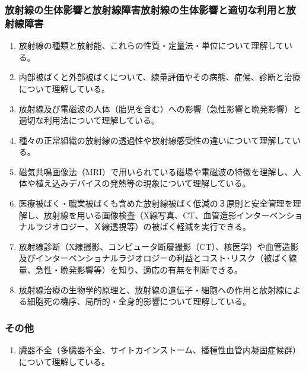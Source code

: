 \hypertarget{ux653eux5c04ux7ddaux306eux751fux4f53ux5f71ux97ffux3068ux653eux5c04ux7ddaux969cux5bb3ux653eux5c04ux7ddaux306eux751fux4f53ux5f71ux97ffux3068ux9069ux5207ux306aux5229ux7528ux3068ux653eux5c04ux7ddaux969cux5bb3}{%
\subsubsection{放射線の生体影響と放射線障害放射線の生体影響と適切な利用と放射線障害}\label{ux653eux5c04ux7ddaux306eux751fux4f53ux5f71ux97ffux3068ux653eux5c04ux7ddaux969cux5bb3ux653eux5c04ux7ddaux306eux751fux4f53ux5f71ux97ffux3068ux9069ux5207ux306aux5229ux7528ux3068ux653eux5c04ux7ddaux969cux5bb3}}

\begin{enumerate}
\def\labelenumi{\arabic{enumi}.}
\tightlist
\item
  放射線の種類と放射能、これらの性質・定量法・単位について理解している。
\item
  内部被ばくと外部被ばくについて、線量評価やその病態、症候、診断と治療について理解している。
\item
  放射線及び電磁波の人体（胎児を含む）への影響（急性影響と晩発影響）と適切な利用法について理解している。
\item
  種々の正常組織の放射線の透過性や放射線感受性の違いについて理解している。
\item
  磁気共鳴画像法（MRI）で用いられている磁場や電磁波の特徴を理解し、人体や植え込みデバイスの発熱等の現象について理解している。
\item
  医療被ばく・職業被ばくも含めた放射線被ばく低減の３原則と安全管理を理解し、放射線を用いる画像検査（X線写真、CT、血管造影インターベンショナルラジオロジー、Ｘ線透視等）の被ばく軽減を実行できる。
\item
  放射線診断（X線撮影、コンピュータ断層撮影（CT）、核医学）や血管造影及びインターベンショナルラジオロジーの利益とコスト･リスク（被ばく線量、急性・晩発影響等）を知り、適応の有無を判断できる。
\item
  放射線治療の生物学的原理と、放射線の遺伝子・細胞への作用と放射線による細胞死の機序、局所的・全身的影響について理解している。
\end{enumerate}

\hypertarget{ux305dux306eux4ed6}{%
\subsubsection{その他}\label{ux305dux306eux4ed6}}

\begin{enumerate}
\def\labelenumi{\arabic{enumi}.}
\tightlist
\item
  臓器不全（多臓器不全、サイトカインストーム、播種性血管内凝固症候群）について理解している。
\end{enumerate}

